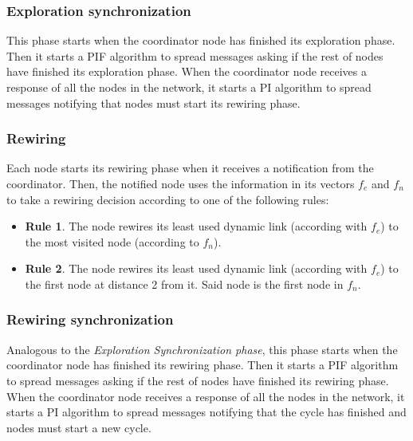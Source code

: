\subsubsection{Exploration synchronization}

This phase starts when the coordinator node has finished its exploration phase. Then it starts a PIF algorithm to spread messages asking if the rest of nodes have finished its exploration phase. When the coordinator node receives a response of all the nodes in the network,  it starts a PI algorithm to spread messages notifying that nodes must start its rewiring phase.

\subsubsection{Rewiring}

Each node starts its rewiring phase when it receives a notification from the coordinator. Then, the notified node uses the information in its vectors $f_e$ and $f_n$ to take a rewiring decision according to one of the following rules:
\begin{itemize}
    \item \textbf{Rule 1}. The node rewires its least used dynamic link (according with $f_e$) to the most visited node (according to $f_n$).
    \item \textbf{Rule 2}. The node rewires its least used dynamic link (according with $f_e$) to the first node at distance 2 from it. Said node is the first node in $f_n$.
\end{itemize}

\subsubsection{Rewiring synchronization}

Analogous to the \textit{Exploration Synchronization phase}, this phase starts when the coordinator node has finished its rewiring phase. Then it starts a PIF algorithm to spread messages asking if the rest of nodes have finished its rewiring phase. When the coordinator node receives a response of all the nodes in the network, it starts a PI algorithm to spread messages notifying that the cycle has finished and nodes must start a new cycle.

